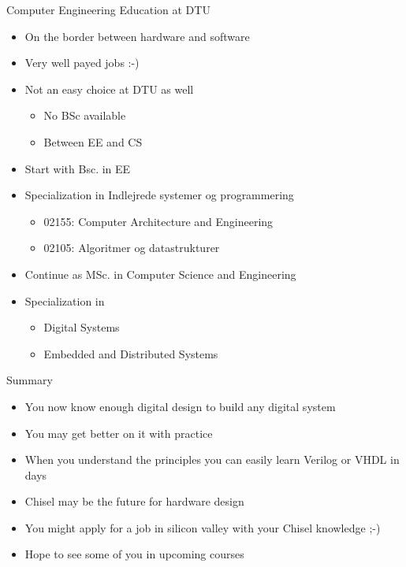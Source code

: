\begin{frame}[fragile]{Computer Engineering Education at DTU}
\begin{itemize}
\item On the border between hardware and software
\item Very well payed jobs :-)
\item Not an easy choice at DTU as well
\begin{itemize}
\item No BSc available
\item Between EE and CS
\end{itemize}
\item Start with Bsc. in EE
\item Specialization in Indlejrede systemer og programmering
\begin{itemize}
\item 02155: Computer Architecture and Engineering
\item 02105: Algoritmer og datastrukturer
\end{itemize}
\item Continue as MSc. in Computer Science and Engineering
\item Specialization in
\begin{itemize}
\item Digital Systems
\item Embedded and Distributed Systems
\end{itemize}
\end{itemize}
\end{frame}

\begin{frame}[fragile]{Summary}
\begin{itemize}
\item You now know enough digital design to build any digital system
\item You may get better on it with practice
\item When you understand the principles you can easily learn Verilog or VHDL in days
\item Chisel may be the future for hardware design
\item You might apply for a job in silicon valley with your Chisel knowledge ;-)
\item Hope to see some of you in upcoming courses
\end{itemize}
\end{frame}






